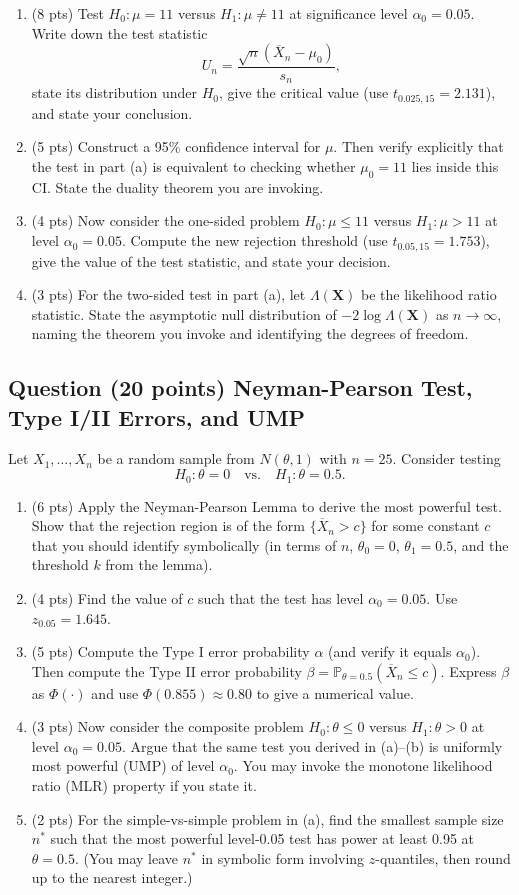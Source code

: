 \documentclass[11pt]{article}
\newcounter{qnum}
\newcommand{\question}[2]{\stepcounter{qnum}\subsection*{Question \theqnum \quad (#1 points) \hfill #2}}
\begin{document}
\begin{enumerate}[label=(\alph*),leftmargin=2em]
    \item (8 pts) Test $H_0: \mu = 11$ versus $H_1: \mu \neq 11$ at significance level $\alpha_0 = 0.05$. Write down the test statistic
    \[ U_n = \frac{\sqrt{n}(\overline{X}_n - \mu_0)}{s_n}, \]
    state its distribution under $H_0$, give the critical value (use $t_{0.025,15} = 2.131$), and state your conclusion.
    \item (5 pts) Construct a 95\% confidence interval for $\mu$. Then verify explicitly that the test in part (a) is equivalent to checking whether $\mu_0 = 11$ lies inside this CI. State the duality theorem you are invoking.
    \item (4 pts) Now consider the one-sided problem $H_0: \mu \le 11$ versus $H_1: \mu > 11$ at level $\alpha_0 = 0.05$. Compute the new rejection threshold (use $t_{0.05,15} = 1.753$), give the value of the test statistic, and state your decision.
    \item (3 pts) For the two-sided test in part (a), let $\Lambda(\mathbf{X})$ be the likelihood ratio statistic. State the asymptotic null distribution of $-2 \log \Lambda(\mathbf{X})$ as $n \to \infty$, naming the theorem you invoke and identifying the degrees of freedom.
\end{enumerate}

\question{20}{Neyman-Pearson Test, Type I/II Errors, and UMP}
Let $X_1,\ldots,X_n$ be a random sample from $N(\theta, 1)$ with $n = 25$. Consider testing
\[ H_0: \theta = 0 \quad \text{vs.} \quad H_1: \theta = 0.5. \]

\begin{enumerate}[label=(\alph*),leftmargin=2em]
    \item (6 pts) Apply the Neyman-Pearson Lemma to derive the most powerful test. Show that the rejection region is of the form $\{\overline{X}_n > c\}$ for some constant $c$ that you should identify symbolically (in terms of $n$, $\theta_0=0$, $\theta_1=0.5$, and the threshold $k$ from the lemma).
    \item (4 pts) Find the value of $c$ such that the test has level $\alpha_0 = 0.05$. Use $z_{0.05} = 1.645$.
    \item (5 pts) Compute the Type I error probability $\alpha$ (and verify it equals $\alpha_0$). Then compute the Type II error probability $\beta = \mathbb{P}_{\theta = 0.5}(\overline{X}_n \le c)$. Express $\beta$ as $\Phi(\cdot)$ and use $\Phi(0.855) \approx 0.80$ to give a numerical value.
    \item (3 pts) Now consider the composite problem $H_0: \theta \le 0$ versus $H_1: \theta > 0$ at level $\alpha_0 = 0.05$. Argue that the same test you derived in (a)--(b) is uniformly most powerful (UMP) of level $\alpha_0$. You may invoke the monotone likelihood ratio (MLR) property if you state it.
    \item (2 pts) For the simple-vs-simple problem in (a), find the smallest sample size $n^*$ such that the most powerful level-0.05 test has power at least 0.95 at $\theta = 0.5$. (You may leave $n^*$ in symbolic form involving $z$-quantiles, then round up to the nearest integer.)
\end{enumerate}
\end{document}

